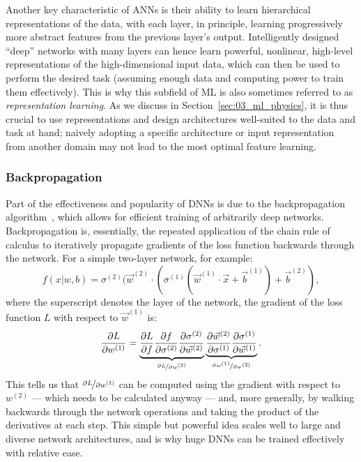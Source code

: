 Another key characteristic of ANNs is their ability to learn hierarchical representations of the data, with each layer, in principle, learning progressively more abstract features from the previous layer's output.
Intelligently designed ``deep'' networks with many layers can hence learn powerful, nonlinear, high-level representations of the high-dimensional input data, which can then be used to perform the desired task (assuming enough data and computing power to train them effectively).
This is why this subfield of ML is also sometimes referred to as \textit{representation learning}.
As we discuss in Section~\ref{sec:03_ml_physics}, it is thus crucial to use representations and design architectures well-suited to the data and task at hand; naively adopting a specific architecture or input representation from another domain may not lead to the most optimal feature learning.


\subsubsection{Backpropagation}

Part of the effectiveness and popularity of DNNs is due to the backpropagation algorithm~\cite{rumelhart1986learning}, which allows for efficient training of arbitrarily deep networks.
Backpropagation is, essentially, the repeated application of the chain rule of calculus to iteratively propagate gradients of the loss function backwards through the network.
For a simple two-layer network, for example:
\begin{equation}
    \label{eq:03_ml_backprop_nn}
    f(x|w, b) = \sigma^{(2)}(\vec{w}^{(2)} \cdot (\sigma^{(1)}(\vec{w}^{(1)} \cdot \vec{x} + \vec{b}^{(1)}) + \vec{b}^{(2)}),
\end{equation}
where the superscript denotes the layer of the network, the gradient of the loss function $L$ with respect to $\vec{w}^{(1)}$ is:
\begin{equation}
    \label{eq:03_ml_backprop}
    \frac{\partial L}{\partial w^{(1)}} = \underbrace{\frac{\partial L}{\partial f} \frac{\partial f}{\partial \sigma^{(2)}} \frac{\partial \sigma^{(2)}}{\partial \vec{w}^{(2)}}}_{\nicefrac{\partial L}{\partial w^{(2)}}}
    \underbrace{\frac{\partial \vec{w}^{(2)}}{\partial \sigma^{(1)}} \frac{\partial \sigma^{(1)}}{\partial \vec{w}^{(1)}}}_{\nicefrac{\partial w^{(1)}}{\partial w^{(2)}}}.
\end{equation}
This tells us that $\nicefrac{\partial L}{\partial w^{(1)}}$ can be computed using the gradient with respect to $w^{(2)}$ --- which needs to be calculated anyway --- and, more generally, by walking backwards through the network operations and taking the product of the derivatives at each step.
This simple but powerful idea scales well to large and diverse network architectures, and is why huge DNNs can be trained effectively with relative ease.

